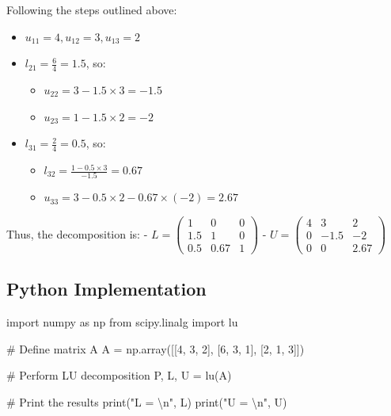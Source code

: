 \documentclass[
  letterpaper,
  DIV=11,
  numbers=noendperiod]{scrreprt}
\newenvironment{Shaded}{\begin{snugshade}}{\end{snugshade}}
\newcommand{\BuiltInTok}[1]{\textcolor[rgb]{0.00,0.23,0.31}{#1}}
\newcommand{\CharTok}[1]{\textcolor[rgb]{0.13,0.47,0.30}{#1}}
\newcommand{\CommentTok}[1]{\textcolor[rgb]{0.37,0.37,0.37}{#1}}
\newcommand{\DecValTok}[1]{\textcolor[rgb]{0.68,0.00,0.00}{#1}}
\newcommand{\ImportTok}[1]{\textcolor[rgb]{0.00,0.46,0.62}{#1}}
\newcommand{\NormalTok}[1]{\textcolor[rgb]{0.00,0.23,0.31}{#1}}
\newcommand{\OperatorTok}[1]{\textcolor[rgb]{0.37,0.37,0.37}{#1}}
\newcommand{\StringTok}[1]{\textcolor[rgb]{0.13,0.47,0.30}{#1}}
\providecommand{\tightlist}{%
  \setlength{\itemsep}{0pt}\setlength{\parskip}{0pt}}\usepackage{longtable,booktabs,array}
\theoremstyle{plain}
\theoremstyle{definition}
\theoremstyle{remark}
\begin{document}
Following the steps outlined above:

\begin{itemize}
\tightlist
\item
  \(u_{11} = 4, u_{12} = 3, u_{13} = 2\)
\item
  \(l_{21} = \frac{6}{4} = 1.5\), so:

  \begin{itemize}
  \tightlist
  \item
    \(u_{22} = 3 - 1.5 \times 3 = -1.5\)
  \item
    \(u_{23} = 1 - 1.5 \times 2 = -2\)
  \end{itemize}
\item
  \(l_{31} = \frac{2}{4} = 0.5\), so:

  \begin{itemize}
  \tightlist
  \item
    \(l_{32} = \frac{1 - 0.5 \times 3}{-1.5} = 0.67\)
  \item
    \(u_{33} = 3 - 0.5 \times 2 - 0.67 \times (-2) = 2.67\)
  \end{itemize}
\end{itemize}

Thus, the decomposition is: - \(L = \begin{pmatrix}
1 & 0 & 0 \\
1.5 & 1 & 0 \\
0.5 & 0.67 & 1
\end{pmatrix}\) - \(U = \begin{pmatrix}
4 & 3 & 2 \\
0 & -1.5 & -2 \\
0 & 0 & 2.67
\end{pmatrix}\)

\subsection{Python Implementation}\label{python-implementation}

\begin{Shaded}
\begin{Highlighting}[]
\ImportTok{import}\NormalTok{ numpy }\ImportTok{as}\NormalTok{ np}
\ImportTok{from}\NormalTok{ scipy.linalg }\ImportTok{import}\NormalTok{ lu}

\CommentTok{\# Define matrix A}
\NormalTok{A }\OperatorTok{=}\NormalTok{ np.array([[}\DecValTok{4}\NormalTok{, }\DecValTok{3}\NormalTok{, }\DecValTok{2}\NormalTok{],}
\NormalTok{              [}\DecValTok{6}\NormalTok{, }\DecValTok{3}\NormalTok{, }\DecValTok{1}\NormalTok{],}
\NormalTok{              [}\DecValTok{2}\NormalTok{, }\DecValTok{1}\NormalTok{, }\DecValTok{3}\NormalTok{]])}

\CommentTok{\# Perform LU decomposition}
\NormalTok{P, L, U }\OperatorTok{=}\NormalTok{ lu(A)}

\CommentTok{\# Print the results}
\BuiltInTok{print}\NormalTok{(}\StringTok{"L = }\CharTok{\textbackslash{}n}\StringTok{"}\NormalTok{, L)}
\BuiltInTok{print}\NormalTok{(}\StringTok{"U = }\CharTok{\textbackslash{}n}\StringTok{"}\NormalTok{, U)}
\end{Highlighting}
\end{Shaded}
\end{document}
